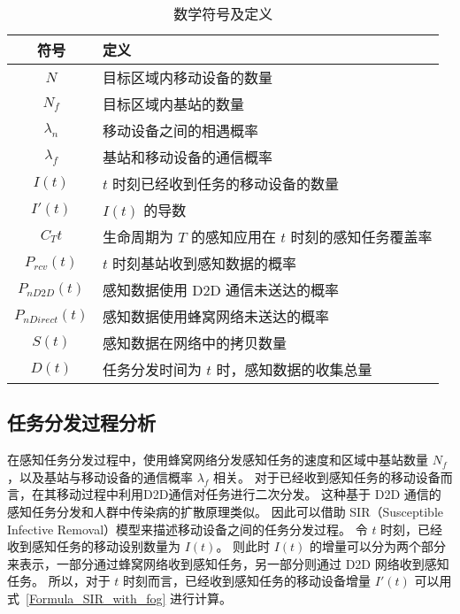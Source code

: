 \begin{table}[h]
  \vspace{-0.5em}
  \caption{数学符号及定义}
  \vspace{-0.5em}
  \centering
  \label{table_notations_UIC}
  \begin{tabular}{|c|p{9.5cm}|}
  \hline
  \textbf{符号} & \textbf{定义}\\
  \hline
  $N$ & 目标区域内移动设备的数量\\\hline
  $N_f$ & 目标区域内基站的数量\\\hline
  $\lambda_n$ & 移动设备之间的相遇概率\\\hline
  $\lambda_f$ & 基站和移动设备的通信概率\\\hline
  $I(t)$ & $t$ 时刻已经收到任务的移动设备的数量\\\hline
  $I'(t)$ & $I(t)$ 的导数\\\hline
  $C_T{t}$ & 生命周期为 $T$ 的感知应用在 $t$ 时刻的感知任务覆盖率\\\hline
  $P_{rcv}(t)$ & $t$ 时刻基站收到感知数据的概率\\\hline
  $P_{nD2D}(t)$ & 感知数据使用 D2D 通信未送达的概率\\\hline
  $P_{nDirect}(t)$ & 感知数据使用蜂窝网络未送达的概率\\\hline
  $S(t)$ & 感知数据在网络中的拷贝数量\\\hline
  $D(t)$ & 任务分发时间为 $t$ 时，感知数据的收集总量\\\hline
\end{tabular}
\end{table}

\subsection{任务分发过程分析}

在感知任务分发过程中，使用蜂窝网络分发感知任务的速度和区域中基站数量 $N_f$，以及基站与移动设备的通信概率 $\lambda_f$ 相关。
对于已经收到感知任务的移动设备而言，在其移动过程中利用D2D通信对任务进行二次分发。
这种基于 D2D 通信的感知任务分发和人群中传染病的扩散原理类似。
因此可以借助 SIR（Susceptible Infective Removal）模型来描述移动设备之间的任务分发过程。
令 $t$ 时刻，已经收到感知任务的移动设别数量为 $I(t)$。
则此时 $I(t)$ 的增量可以分为两个部分来表示，一部分通过蜂窝网络收到感知任务，另一部分则通过 D2D 网络收到感知任务。
所以，对于 $t$ 时刻而言，已经收到感知任务的移动设备增量 $I'(t)$ 可以用式~\eqref{Formula_SIR_with_fog} 进行计算。

